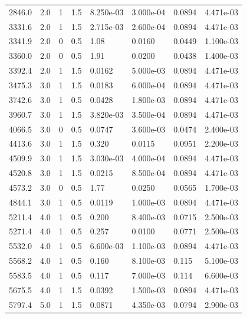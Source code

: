 \documentclass[preview]{standalone}
\begin{document}
{{\begin{tabular}{L{1.2cm}C{1.2cm} C{0.3cm}C{0.5cm} C{1.4cm}C{1.4cm} C{1.4cm}C{1.4cm}}
  2846.0  &   2.0  & 1     & 1.5 &  8.250e-03  & 3.000e-04  & 0.0894 &  4.471e-03   \\ 
  3331.6  &   2.0  & 1     & 1.5 &  2.715e-03  & 2.600e-04  & 0.0894 &  4.471e-03   \\ 
  3341.9  &   2.0  & 0     & 0.5 &  1.08  & 0.0160  & 0.0449 &  1.100e-03   \\ 
  3360.0  &   2.0  & 0     & 0.5 &  1.91  & 0.0200  & 0.0438 &  1.400e-03   \\ 
  3392.4  &   2.0  & 1     & 1.5 &  0.0162  & 5.000e-03  & 0.0894 &  4.471e-03   \\ 
  3475.3  &   3.0  & 1     & 1.5 &  0.0183  & 6.000e-04  & 0.0894 &  4.471e-03   \\ 
  3742.6  &   3.0  & 1     & 0.5 &  0.0428  & 1.800e-03  & 0.0894 &  4.471e-03   \\ 
  3960.7  &   3.0  & 1     & 1.5 &  3.820e-03  & 3.500e-04  & 0.0894 &  4.471e-03   \\ 
  4066.5  &   3.0  & 0     & 0.5 &  0.0747  & 3.600e-03  & 0.0474 &  2.400e-03   \\ 
  4413.6  &   3.0  & 1     & 1.5 &  0.320  & 0.0115  & 0.0951 &  2.200e-03   \\ 
  4509.9  &   3.0  & 1     & 1.5 &  3.030e-03  & 4.000e-04  & 0.0894 &  4.471e-03   \\ 
  4520.8  &   3.0  & 1     & 1.5 &  0.0215  & 8.500e-04  & 0.0894 &  4.471e-03   \\ 
  4573.2  &   3.0  & 0     & 0.5 &  1.77  & 0.0250  & 0.0565 &  1.700e-03   \\ 
  4844.1  &   3.0  & 1     & 0.5 &  0.0119  & 1.000e-03  & 0.0894 &  4.471e-03   \\ 
  5211.4  &   4.0  & 1     & 0.5 &  0.200  & 8.400e-03  & 0.0715 &  2.500e-03   \\ 
  5271.4  &   4.0  & 1     & 0.5 &  0.257  & 0.0100  & 0.0771 &  2.500e-03   \\ 
  5532.0  &   4.0  & 1     & 0.5 &  6.600e-03  & 1.100e-03  & 0.0894 &  4.471e-03   \\ 
  5568.2  &   4.0  & 1     & 0.5 &  0.160  & 8.100e-03  & 0.115 &  5.100e-03   \\ 
  5583.5  &   4.0  & 1     & 0.5 &  0.117  & 7.000e-03  & 0.114 &  6.600e-03   \\ 
  5675.5  &   4.0  & 1     & 1.5 &  0.0392  & 1.500e-03  & 0.0894 &  4.471e-03   \\ 
  5797.4  &   5.0  & 1     & 1.5 &  0.0871  & 4.350e-03  & 0.0794 &  2.900e-03   \\ 

\end{tabular}}}
\end{document}
